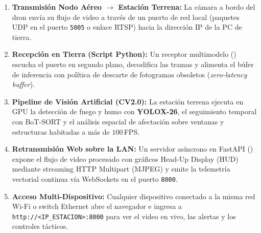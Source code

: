 \documentclass[11pt,a4paper]{article}
\begin{document}
\begin{enumerate}
    \item \textbf{Transmisión Nodo Aéreo $\to$ Estación Terrena:} La cámara a bordo del dron envía su flujo de video a través de un puerto de red local (paquetes UDP en el puerto \texttt{5005} o enlace RTSP) hacia la dirección IP de la PC de tierra.
    \item \textbf{Recepción en Tierra (Script Python):} Un receptor multimodelo () escucha el puerto en segundo plano, decodifica las tramas y alimenta el búfer de inferencia con política de descarte de fotogramas obsoletos (\textit{zero-latency buffer}).
    \item \textbf{Pipeline de Visión Artificial (CV2.0):} La estación terrena ejecuta en GPU la detección de fuego y humo con \textbf{YOLOX-26}, el seguimiento temporal con BoT-SORT y el análisis espacial de afectación sobre ventanas y estructuras habitadas a más de $100$\,FPS.
    \item \textbf{Retransmisión Web sobre la LAN:} Un servidor asíncrono en FastAPI () expone el flujo de video procesado con gráficos Head-Up Display (HUD) mediante streaming HTTP Multipart (MJPEG) y emite la telemetría vectorial continua vía WebSockets en el puerto \texttt{8000}.
    \item \textbf{Acceso Multi-Dispositivo:} Cualquier dispositivo conectado a la misma red Wi-Fi o switch Ethernet abre el navegador e ingresa a \texttt{http://<IP\_ESTACION>:8000} para ver el video en vivo, las alertas y los controles tácticos.
\end{enumerate}
\end{document}
